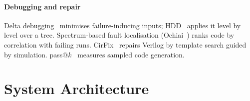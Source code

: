 \documentclass[conference,10pt]{IEEEtran}
\begin{document}
\paragraph*{Debugging and repair} Delta debugging~\cite{ddmin} minimises failure-inducing inputs; HDD~\cite{hdd} applies it level by
level over a tree. Spectrum-based fault localisation (Ochiai~\cite{ochiai}) ranks code by correlation with failing runs. CirFix~\cite{cirfix}
repairs Verilog by template search guided by simulation. pass@$k$~\cite{codex} measures sampled code generation.

\section{System Architecture}\label{sec:arch}
\end{document}
